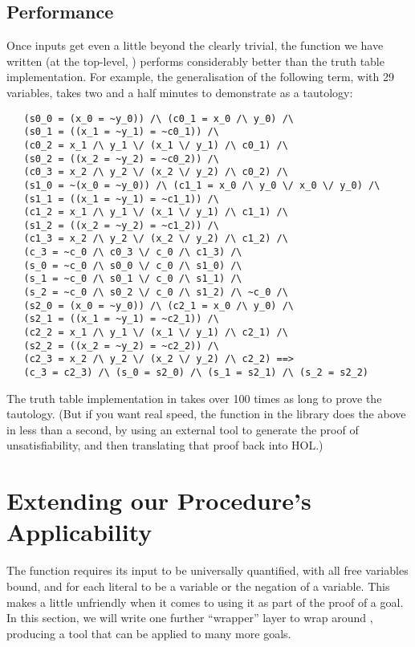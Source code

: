 \subsection{Performance}
\label{sec:dpll-performance}

Once inputs get even a little beyond the clearly trivial, the function
we have written (at the top-level, ) performs considerably
better than the truth table implementation.  For example, the
generalisation of the following term, with 29 variables, takes
 two and a half minutes to demonstrate as a tautology:
\begin{hol}
\begin{verbatim}
   (s0_0 = (x_0 = ~y_0)) /\ (c0_1 = x_0 /\ y_0) /\
   (s0_1 = ((x_1 = ~y_1) = ~c0_1)) /\
   (c0_2 = x_1 /\ y_1 \/ (x_1 \/ y_1) /\ c0_1) /\
   (s0_2 = ((x_2 = ~y_2) = ~c0_2)) /\
   (c0_3 = x_2 /\ y_2 \/ (x_2 \/ y_2) /\ c0_2) /\
   (s1_0 = ~(x_0 = ~y_0)) /\ (c1_1 = x_0 /\ y_0 \/ x_0 \/ y_0) /\
   (s1_1 = ((x_1 = ~y_1) = ~c1_1)) /\
   (c1_2 = x_1 /\ y_1 \/ (x_1 \/ y_1) /\ c1_1) /\
   (s1_2 = ((x_2 = ~y_2) = ~c1_2)) /\
   (c1_3 = x_2 /\ y_2 \/ (x_2 \/ y_2) /\ c1_2) /\
   (c_3 = ~c_0 /\ c0_3 \/ c_0 /\ c1_3) /\
   (s_0 = ~c_0 /\ s0_0 \/ c_0 /\ s1_0) /\
   (s_1 = ~c_0 /\ s0_1 \/ c_0 /\ s1_1) /\
   (s_2 = ~c_0 /\ s0_2 \/ c_0 /\ s1_2) /\ ~c_0 /\
   (s2_0 = (x_0 = ~y_0)) /\ (c2_1 = x_0 /\ y_0) /\
   (s2_1 = ((x_1 = ~y_1) = ~c2_1)) /\
   (c2_2 = x_1 /\ y_1 \/ (x_1 \/ y_1) /\ c2_1) /\
   (s2_2 = ((x_2 = ~y_2) = ~c2_2)) /\
   (c2_3 = x_2 /\ y_2 \/ (x_2 \/ y_2) /\ c2_2) ==>
   (c_3 = c2_3) /\ (s_0 = s2_0) /\ (s_1 = s2_1) /\ (s_2 = s2_2)
\end{verbatim}
\end{hol}
The truth table implementation in \ml{tautLib} takes over 100 times as
long to prove the tautology.  (But if you want real speed, the
\ml{SAT\_PROVE} function in the  library does the
above in less than a second, by using an external tool to generate the
proof of unsatisfiability, and then translating that proof back into
HOL.)

\section{Extending our Procedure's Applicability}
\label{sec:dpll-applicability-extension}

The function  requires its input to be universally
quantified, with all free variables bound, and for each literal to be
a variable or the negation of a variable.  This makes \ml{DPLL\_UNIV}
a little unfriendly when it comes to using it as part of the proof of
a goal.  In this section, we will write one further ``wrapper''
layer to wrap around \ml{DPLL\_UNIV}, producing a tool that can be
applied to many more goals.

